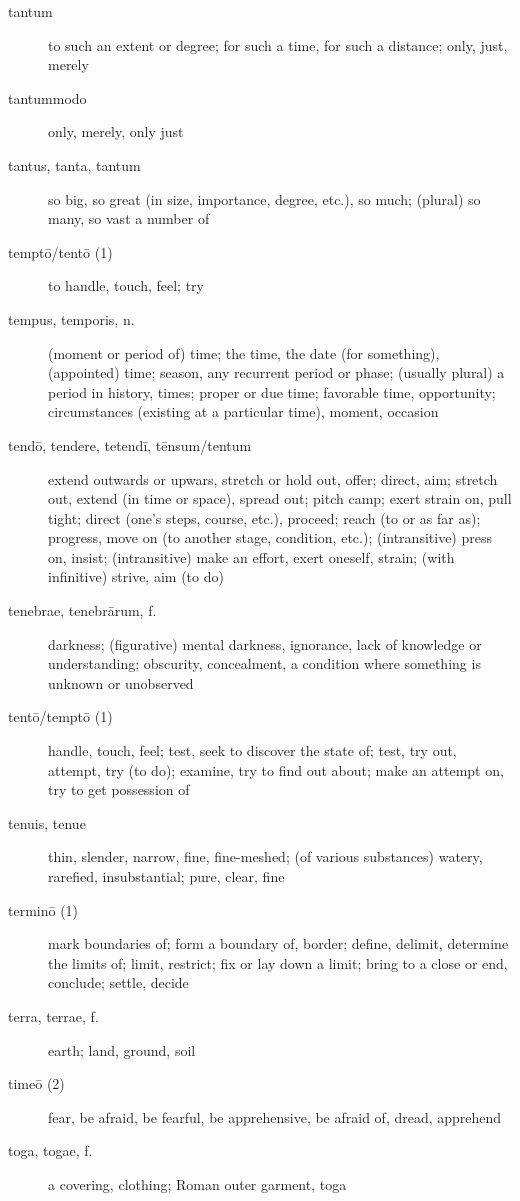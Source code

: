 \begin{description}
    \item[tantum] to such an extent or degree; for such a time, for such a distance; only, just, merely
    \item[tantummodo] only, merely, only just
    \item[tantus, tanta, tantum] so big, so great (in size, importance, degree, etc.), so much; (plural) so many, so vast a number of
    \item[temptō/tentō (1)] to handle, touch, feel; try
    \item[tempus, temporis, n.] (moment or period of) time; the time, the date (for something), (appointed) time; season, any recurrent period or phase; (usually plural) a period in history, times; proper or due time; favorable time, opportunity; circumstances (existing at a particular time), moment, occasion
    \item[tendō, tendere, tetendī, tēnsum/tentum] extend outwards or upwars, stretch or hold out, offer; direct, aim; stretch out, extend (in time or space), spread out; pitch camp; exert strain on, pull tight; direct (one's steps, course, etc.), proceed; reach (to or as far as); progress, move on (to another stage, condition, etc.); (intransitive) press on, insist; (intransitive) make an effort, exert oneself, strain; (with infinitive) strive, aim (to do)
    \item[tenebrae, tenebrārum, f.] darkness; (figurative) mental darkness, ignorance, lack of knowledge or understanding; obscurity, concealment, a condition where something is unknown or unobserved
    \item[tentō/temptō (1)] handle, touch, feel; test, seek to discover the state of; test, try out, attempt, try (to do); examine, try to find out about; make an attempt on, try to get possession of
    \item[tenuis, tenue] thin, slender, narrow, fine, fine-meshed; (of various substances) watery, rarefied, insubstantial; pure, clear, fine
    \item[terminō (1)] mark boundaries of; form a boundary of, border; define, delimit, determine the limits of; limit, restrict; fix or lay down a limit; bring to a close or end, conclude; settle, decide
    \item[terra, terrae, f.] earth; land, ground, soil
    \item[timeō (2)] fear, be afraid, be fearful, be apprehensive, be afraid of, dread, apprehend
    \item[toga, togae, f.] a covering, clothing; Roman outer garment, toga

\end{description}
